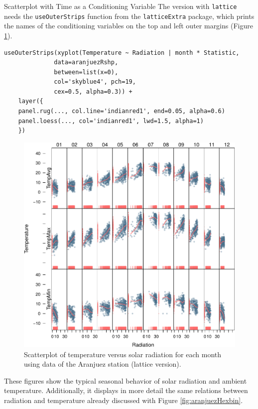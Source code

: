 \documentclass[presentation]{beamer}
\begin{document}
\begin{frame}[fragile,label=sec-2]{Scatterplot with Time as a Conditioning Variable}
The version with \texttt{lattice} needs the \texttt{useOuterStrips} function from
the \texttt{latticeExtra} package, which prints the names of the conditioning
variables on the top and left outer margins (Figure
\ref{fig:aranjuezOuterStrips}).


\lstset{language=R,numbers=none}
\begin{lstlisting}
useOuterStrips(xyplot(Temperature ~ Radiation | month * Statistic,
		      data=aranjuezRshp,
		      between=list(x=0),
		      col='skyblue4', pch=19,
		      cex=0.5, alpha=0.3)) +
    layer({
	panel.rug(..., col.line='indianred1', end=0.05, alpha=0.6)
	panel.loess(..., col='indianred1', lwd=1.5, alpha=1)
    })
\end{lstlisting}

\begin{figure}[htb]
\centering
\includegraphics[width=.9\linewidth]{figs/aranjuezOuterStrips.pdf}
\caption{\label{fig:aranjuezOuterStrips}Scatterplot of temperature versus solar radiation for each month using data of the Aranjuez station (lattice version).}
\end{figure}

These figures show the typical seasonal behavior of solar radiation
and ambient temperature. Additionally, it displays in more detail the
same relations between radiation and temperature already discussed
with Figure \ref{fig:aranjuezHexbin}.
\end{frame}
\end{document}

